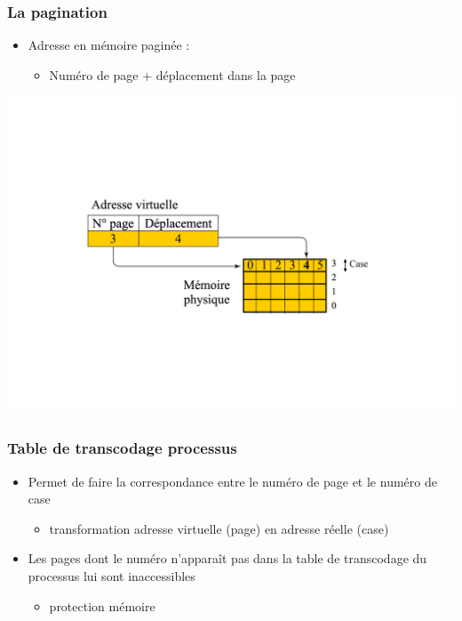 \begin{frame}
\frametitle{La pagination}
\begin{itemize}
\item Adresse en mémoire paginée :
\begin{itemize}
\item Numéro de page + déplacement dans la page
\end{itemize}
\end{itemize}
\includegraphics[width=.9\textwidth]{../illustration/memoire_paginee_deplacement.pdf}
\end{frame}


\begin{frame}
\frametitle{Table de transcodage processus}
\begin{itemize}
\item Permet de faire la correspondance entre le numéro de page et le numéro de case
\begin{itemize}
\item transformation adresse virtuelle (page) en adresse réelle (case)
\end{itemize}
\item Les pages dont le numéro n'apparaît pas dans la table de transcodage du processus lui sont inaccessibles
\begin{itemize}
\item protection mémoire
\end{itemize}
\end{itemize}
\end{frame}

